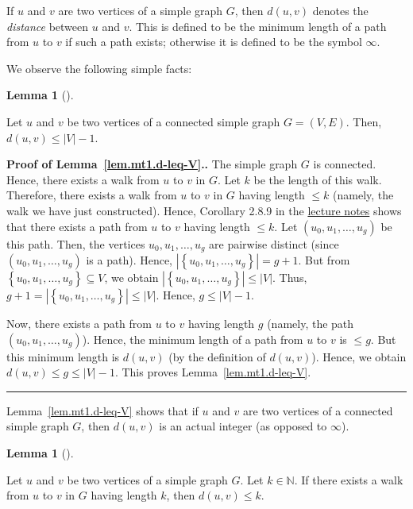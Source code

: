\documentclass[numbers=enddot,12pt,final,onecolumn,notitlepage]{scrartcl}%
\theoremstyle{definition}
\newtheorem{lem}[theo]{Lemma}
\newenvironment{lemma}[1][]
{\begin{lem}[#1]\begin{leftbar}}
{\end{leftbar}\end{lem}}
\newenvironment{proof}[1][Proof]{\noindent\textbf{#1.} }{\ \rule{0.5em}{0.5em}}
\newcommand{\NN}{\mathbb{N}}
\newcommand{\set}[1]{\left\{ #1 \right\}}
\newcommand{\abs}[1]{\left| #1 \right|}
\newcommand{\tup}[1]{\left( #1 \right)}
\begin{document}
If $u$ and $v$ are two vertices of a simple graph $G$, then
$d \tup{u, v}$ denotes the \textit{distance} between $u$ and $v$. This
is defined to be the minimum length of a path from $u$ to $v$ if
such a path exists; otherwise it is defined to be the symbol $\infty$.

We observe the following simple facts:

\begin{lemma} \label{lem.mt1.d-leq-V}
Let $u$ and $v$ be two vertices of a connected simple graph
$G = \tup{V, E}$.
Then, $d \tup{u, v} \leq \abs{V} - 1$.
\end{lemma}

\begin{proof}[Proof of Lemma~\ref{lem.mt1.d-leq-V}.]
The simple graph $G$ is connected. Hence, there exists a walk from $u$
to $v$ in $G$. Let $k$ be the length of this walk. Therefore, there
exists a walk from $u$ to $v$ in $G$ having length $\leq k$ (namely,
the walk we have just constructed).
Hence, Corollary 2.8.9 in the
\href{http://www-users.math.umn.edu/~dgrinber/5707s17/nogra.pdf}{lecture notes}
shows that there exists a path from $u$ to $v$ having length
$\leq k$. Let $\tup{u_0, u_1, \ldots, u_g}$ be this path. Then, the
vertices $u_0, u_1, \ldots, u_g$ are pairwise distinct (since
$\tup{u_0, u_1, \ldots, u_g}$ is a path). Hence,
$\abs{\set{u_0, u_1, \ldots, u_g}} = g+1$. But from
$\set{u_0, u_1, \ldots, u_g} \subseteq V$, we obtain
$\abs{\set{u_0, u_1, \ldots, u_g}} \leq \abs{V}$. Thus,
$g + 1 = \abs{\set{u_0, u_1, \ldots, u_g}} \leq \abs{V}$.
Hence, $g \leq \abs{V} - 1$.

Now, there exists a path from $u$ to $v$ having length $g$ (namely,
the path $\tup{u_0, u_1, \ldots, u_g}$). Hence, the minimum length of
a path from $u$ to $v$ is $\leq g$. But this minimum length is
$d \tup{u, v}$ (by the definition of $d \tup{u, v}$). Hence, we obtain
$d \tup{u, v} \leq g \leq \abs{V} - 1$. This proves
Lemma~\ref{lem.mt1.d-leq-V}.
\end{proof}

Lemma~\ref{lem.mt1.d-leq-V} shows that if $u$ and $v$ are two
vertices of a connected simple graph $G$, then $d \tup{u, v}$ is an
actual integer (as opposed to $\infty$).

\begin{lemma} \label{lem.mt1.walk-to-distance}
Let $u$ and $v$ be two vertices of a simple graph $G$. Let
$k \in \NN$. If there exists a walk from $u$ to $v$ in $G$ having
length $k$, then $d \tup{u, v} \leq k$.
\end{lemma}
\end{document}
